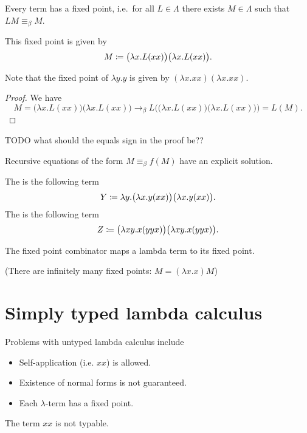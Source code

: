 \begin{proposition}
Every term has a fixed point, i.e.\ for all $L\in\Lambda$ there exists $M\in\Lambda$ such that $LM \equiv_\beta M$.

This fixed point is given by
\[ M \coloneqq \big(\lambda x. L(xx)\big)\big(\lambda x. L(xx)\big). \]
\end{proposition}
Note that the fixed point of $\lambda y. y$ is given by $(\lambda x. x x)(\lambda x. x x)$.
\begin{proof}
We have
\[ M = \big(\lambda x. L(xx)\big)\big(\lambda x. L(xx)\big) \to_\beta L\Big(\big(\lambda x. L(xx)\big)\big(\lambda x. L(xx)\big)\Big) = L(M). \]
\end{proof}
TODO what should the equals sign in the proof be??
\begin{corollary}
Recursive equations of the form $M \equiv_\beta f(M)$ have an explicit solution.
\end{corollary}

\begin{definition}
The  is the following term
\[ Y \coloneqq \lambda y. \big(\lambda x.y(xx)\big)\big(\lambda x.y(xx)\big). \]
The  is the following term
\[ Z \coloneqq \big(\lambda xy. x(yyx)\big)\big(\lambda xy. x(yyx)\big). \]
\end{definition}
The fixed point combinator maps a lambda term to its fixed point.

(There are infinitely many fixed points: $M = (\lambda x.x)M$)

\section{Simply typed lambda calculus}
Problems with untyped lambda calculus include
\begin{itemize}
\item Self-application (i.e. $xx$) is allowed.
\item Existence of normal forms is not guaranteed.
\item Each $\lambda$-term has a fixed point.
\end{itemize}

The term $xx$ is not typable.

